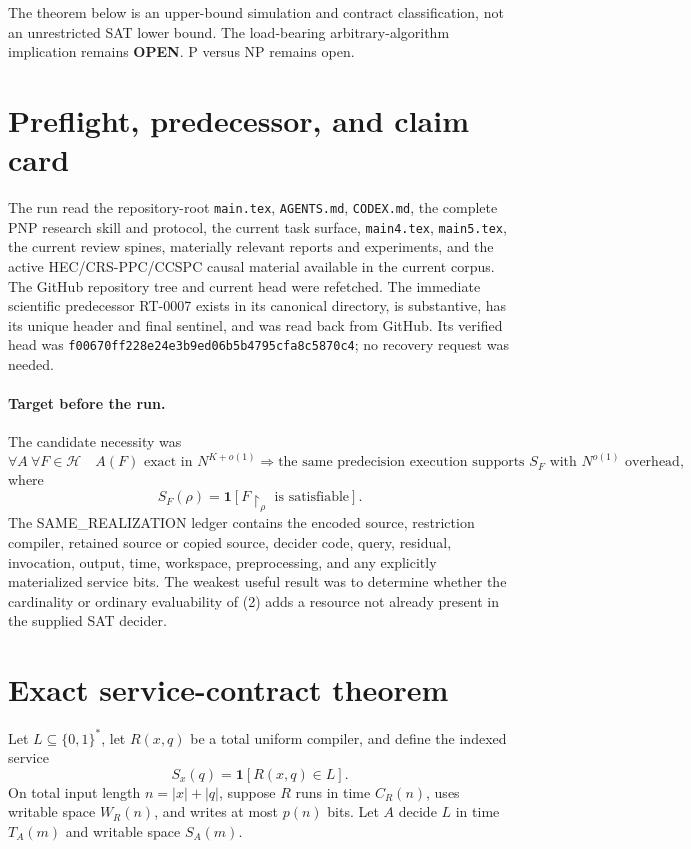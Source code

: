 \documentclass[11pt]{article}
\newcommand{\OPEN}{\textbf{OPEN}}
\begin{document}
The theorem below is an upper-bound simulation and contract classification,
not an unrestricted SAT lower bound.  The load-bearing arbitrary-algorithm
implication remains \OPEN.  P versus NP remains open.

\section{Preflight, predecessor, and claim card}

The run read the repository-root \texttt{main.tex}, \texttt{AGENTS.md},
\texttt{CODEX.md}, the complete PNP research skill and protocol, the current
task surface, \texttt{main4.tex}, \texttt{main5.tex}, the current review
spines, materially relevant reports and experiments, and the active
HEC/CRS-PPC/CCSPC causal material available in the current corpus.  The
GitHub repository tree and current head were refetched.  The immediate
scientific predecessor RT-0007 exists in its canonical directory, is
substantive, has its unique header and final sentinel, and was read back from
GitHub.  Its verified head was
\texttt{f00670ff228e24e3b9ed06b5b4795cfa8c5870c4}; no recovery request was
needed.

\paragraph{Target before the run.}
The candidate necessity was
\[
\forall A\ \forall F\in\mathcal H\quad
A(F)\text{ exact in }N^{K+o(1)}
\Longrightarrow
\text{the same predecision execution supports }S_F
\text{ with }N^{o(1)}\text{ overhead},                 \tag{1}
\]
where
\[
S_F(\rho)=\mathbf 1[F\!\upharpoonright_\rho\text{ is satisfiable}].       \tag{2}
\]
The SAME\_REALIZATION ledger contains the encoded source, restriction
compiler, retained source or copied source, decider code, query, residual,
invocation, output, time, workspace, preprocessing, and any explicitly
materialized service bits.  The weakest useful result was to determine
whether the cardinality or ordinary evaluability of (2) adds a resource not
already present in the supplied SAT decider.

\section{Exact service-contract theorem}

Let $L\subseteq\{0,1\}^*$, let $R(x,q)$ be a total uniform compiler, and
define the indexed service
\[
S_x(q)=\mathbf 1[R(x,q)\in L].                            \tag{3}
\]
On total input length $n=|x|+|q|$, suppose $R$ runs in time $C_R(n)$,
uses writable space $W_R(n)$, and writes at most $p(n)$ bits.  Let $A$
decide $L$ in time $T_A(m)$ and writable space $S_A(m)$.
\end{document}
